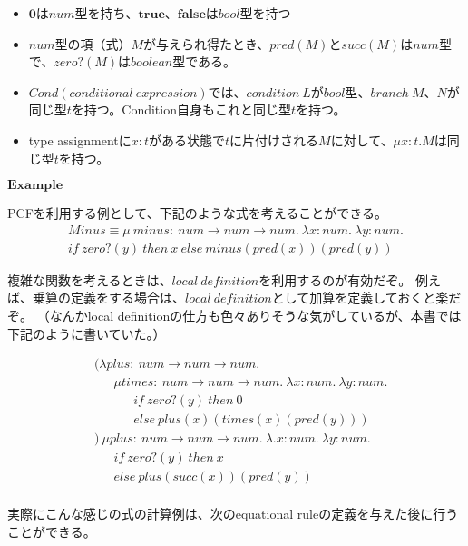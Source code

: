 \documentclass[9pt,fleqn]{jarticle}
\begin{document}
\hrulefill

\begin{itemize}
	\item $\bm{0}$は$num$型を持ち、$\bm{true}$、$\bm{false}$は$bool$型を持つ
	\item $num$型の項（式）$M$が与えられ得たとき、$pred(M)$と$succ(M)$は$num$型で、$zero?(M)$は$boolean$型である。
	\item $Cond(conditional\ expression)$では、$condition\ L$が$bool$型、$branch\ M、N$が同じ型$t$を持つ。Condition自身もこれと同じ型$t$を持つ。
	\item type assignmentに$x:t$がある状態で$t$に片付けされる$M$に対して、$\mu x:t.M$は同じ型$t$を持つ。
\end{itemize}

$\bm{Example}$

PCFを利用する例として、下記のような式を考えることができる。
\begin{eqnarray}
	Minus \equiv \mu\ minus:\ num \rightarrow num \rightarrow num.\ \lambda x:num.\ \lambda y:num. \nonumber \\
	if\ zero?(y)\ then\ x\ else\ minus(pred(x))(pred(y)) \nonumber
\end{eqnarray}

複雑な関数を考えるときは、$local\ definition$を利用するのが有効だぞ。
例えば、乗算の定義をする場合は、$local\ definition$として加算を定義しておくと楽だぞ。
（なんかlocal definitionの仕方も色々ありそうな気がしているが、本書では下記のように書いていた。）

\begin{align*}
	& (\lambda plus:\ num \rightarrow num \rightarrow num. \\
		&\ \ \ \ \ \ \ \mu times:\ num \rightarrow num \rightarrow num.\ \lambda x:num.\ \lambda y:num. \\
			&\ \ \ \ \ \ \ \ \ \ \ \ \ \ if\ zero?(y)\ then\ 0 \\
			&\ \ \ \ \ \ \ \ \ \ \ \ \ \ else\ plus(x)(times(x)(pred(y))) \\
	& )\ \mu plus:\ num \rightarrow num \rightarrow num.\ \lambda. x:num.\ \lambda y:num. \\
		&\ \ \ \ \ \ \ if\ zero?(y)\ then\ x \\
		&\ \ \ \ \ \ \ else\ plus(succ(x))(pred(y)) \\
\end{align*}

実際にこんな感じの式の計算例は、次のequational ruleの定義を与えた後に行うことができる。
\end{document}
